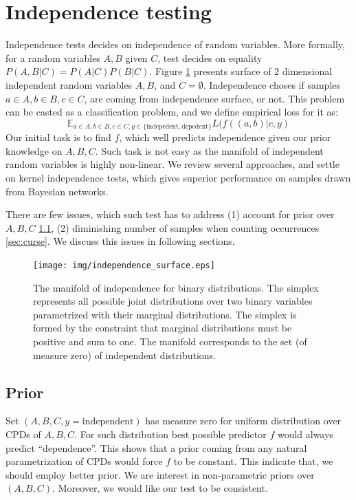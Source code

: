 \documentclass{article} %
\begin{document}
\section{Independence testing} 
Independence tests decides on independence of random variables. More formally,
for a random variables $A, B$ given $C$, test decides on equality $P(A, B| C) = P(A | C) P(B | C)$. 
Figure \ref{fig:ind} presents surface of $2$ dimensional independent 
random variables $A, B$, and $C = \emptyset$. Independence choses if samples $a \in A, b \in B, c \in C$, 
are coming from independence surface, or not. 
This problem can be casted as a classification problem, and we define
empirical loss for it as:
\begin{equation}
  \mathbb{E}_{a \in A, b \in B, c \in C, y \in \{\text{indepedent}, \text{depedent}\}} L(f((a, b)|c, y)
\end{equation}
Our initial task is to find $f$, which well predicts independence given our prior
knowledge on $A, B, C$. Such task is not easy as the manifold of independent
random variables is highly non-linear. We review several approaches, and 
settle on kernel independence tests, which gives superior performance on
samples drawn from Bayesian networks.


There are few issues, which such test has to address 
(1) account for prior over $A, B, C$ \ref{sec:prior}, (2) diminishing number of samples when
counting occurrences \ref{sec:curse}. We discuss this issues
in following sections. 


\begin{figure}[h]
\centering
\texttt{[image: img/independence\_surface.eps]}
\caption{The manifold of independence for binary distributions. The simplex represents all possible joint distributions over two binary variables parametrized with their marginal distributions. The simplex is formed by the constraint that marginal distributions must be positive and sum to one.  The manifold corresponds to the set (of measure zero) of independent distributions.}
\label{fig:ind}
\end{figure}

\subsection{Prior}\label{sec:prior}
Set $(A, B, C, y=\text{independent})$ has measure zero for uniform
distribution over CPDs of $A, B, C$. For such distribution
best possible predictor $f$ would always predict ``dependence''. 
This shows that a prior coming from any natural parametrization
of CPDs would force $f$ to be constant. This indicate that, we should
employ better prior. We are interest in non-parametric priors over $(A, B, C)$.
Moreover, we would like our test to be consistent.
\end{document}
